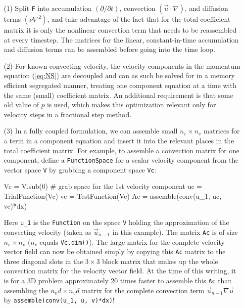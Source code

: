 \begin{itemize}
 \item[(1)] Split {\fontsize{12pt}{12pt}\texttt{F}} into accumulation $(\partial /\partial t)$,
convection $(\vec{u}\cdot\nabla)$, and diffusion terms
$(\nu\nabla^2)$, and take advantage of the fact that for the total
coefficient matrix it is only the nonlinear convection term that needs
to be reassembled at every timestep. The matrices for the linear,
constant-in-time accumulation and diffusion terms can be assembled
before going into the time loop.

\item[(2)] For known convecting velocity, 
 the velocity components in the momentum equation (\ref{eq:NS})
 are decoupled and can as such be solved for in a
 memory efficient segregated manner, treating one component equation
 at a time with the same (small) coefficient matrix. An additional requirement is that some old value of $p$ is used,
 which makes this optimization relevant only for velocity steps in
 a fractional step method.

\item[(3)]
 In a fully coupled formulation,
 we can assemble small $n_v\times n_v$ matrices for a term in a
 component equation and insert it into the relevant places in
 the total coefficient matrix.
 For example, to assemble a convection matrix for one component, define
 a {\fontsize{12pt}{12pt}\texttt{FunctionSpace}} for a scalar velocity component from the 
 vector space {\fontsize{12pt}{12pt}\texttt{V}} by grabbing a component space {\fontsize{12pt}{12pt}\texttt{Vc}}:
\begin{fenicscode}{0.9}
Vc = V.sub(0)  # grab space for the 1st velocity component
uc = TrialFunction(Vc)
vc = TestFunction(Vc)
Ac = assemble(conv(u_1, uc, vc)*dx)
\end{fenicscode}
Here {\fontsize{12pt}{12pt}\verb!u_1!} is the {\fontsize{12pt}{12pt}\texttt{Function}} on the space {\fontsize{12pt}{12pt}\texttt{V}}
holding the approximation of the
convecting velocity (taken as $\vec{u}_{n-1}$ in this example). 
The matrix {\fontsize{12pt}{12pt}\texttt{Ac}} is of size $n_v\times n_v$ ($n_v$ equals
{\fontsize{12pt}{12pt}\texttt{Vc.dim()}}).
The large matrix for the complete velocity vector field can now be
obtained simply by copying this {\fontsize{12pt}{12pt}\texttt{Ac}} matrix to the three diagonal
slots in the $3\times 3$ block matrix that makes up the whole
convection matrix for the velocity vector field.  At the time of this
writing, it is for a 3D problem approximately 20 times faster to
assemble this {\fontsize{12pt}{12pt}\texttt{Ac}} than assembling the $n_vd\times n_vd$ matrix
for the complete convection term $\vec{u}_{n-1}\nabla
\vec{u}$ by {\fontsize{12pt}{12pt}\verb!assemble(conv(u_1, u, v)*dx)!}!


\end{itemize}
